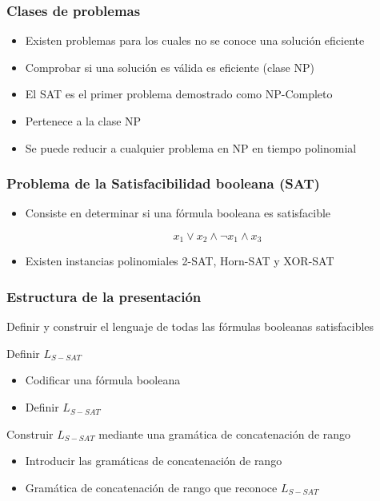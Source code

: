 \documentclass{beamer}
\begin{document}
\begin{frame}
    \frametitle{Clases de problemas}

    \begin{itemize}
        \item Existen problemas para los cuales no se conoce una solución eficiente
              \pause
        \item Comprobar si una solución es válida es eficiente (clase NP)
              \pause
        \item El SAT es el primer problema demostrado como NP-Completo
              \pause
        \item Pertenece a la clase NP
              \pause
        \item Se puede reducir a cualquier problema en NP en tiempo polinomial
    \end{itemize}

\end{frame}

\begin{frame}
    \frametitle{Problema de la Satisfacibilidad booleana (SAT)}

    \begin{itemize}
        \item Consiste en determinar si una fórmula booleana es satisfacible
              \begin{Large}
                  $$x_1\vee x_2 \wedge \neg x_1 \wedge x_3$$
              \end{Large}
              \pause
        \item Existen instancias polinomiales 2-SAT, Horn-SAT y XOR-SAT
    \end{itemize}
\end{frame}

\begin{frame}
    \frametitle{Estructura de la presentación}

    Definir y construir el lenguaje de todas las fórmulas booleanas satisfacibles

    \pause

    \begin{block}{Definir $L_{S-SAT}$}
        \begin{itemize}
            \item Codificar una fórmula booleana
            \item Definir $L_{S-SAT}$
        \end{itemize}
    \end{block}

    \pause

    \begin{block}{Construir $L_{S-SAT}$ mediante una gramática de concatenación de rango}
        \begin{itemize}
            \item Introducir las gramáticas de concatenación de rango
            \item Gramática de concatenación de rango que reconoce $L_{S-SAT}$
        \end{itemize}
    \end{block}
\end{frame}
\end{document}
